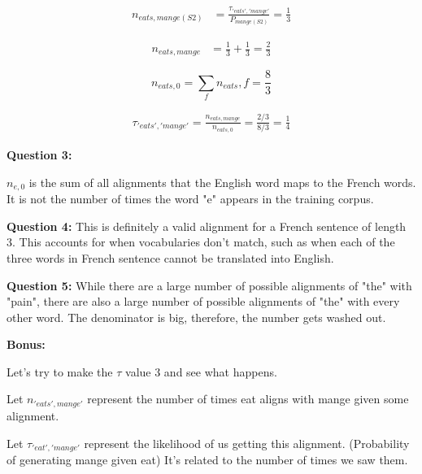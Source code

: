 \documentclass[11pt]{article}
\begin{document}
\begin{center}
\begin{flushleft}
\begin{equation}
    \begin{split}
        n_{eats, mange(S2)} & = \frac{\tau_{'eats', 'mange'}}{P_{mange(S2)}} = \frac{1}{3}
    \end{split}
\end{equation}

\begin{equation}
    \begin{split}
        n_{eats, mange} & = \frac{1}{3} + \frac{1}{3} = \frac{2}{3}
    \end{split}
\end{equation}

\begin{equation}
n_{eats, 0} = \sum_{f}{n_{eats}, f}  = \frac{8}{3}
\end{equation}

\begin{equation}
    \begin{split}
        \tau_{'eats', 'mange'} = \frac{n_{eats, mange}}{n_{eats, 0}} = \frac{2/3}{8/3} = \frac{1}{4}
    \end{split}
\end{equation}


\bigskip
\textbf{Question 3:} 

$n_{e,0}$ is the sum of all alignments that the English word maps to the French words. It is not the number of times the word "e" appears in the training corpus. 

\bigskip

\textbf{Question 4:} 
\bigskip
This is definitely a valid alignment for a French sentence of length 3. This accounts for when vocabularies don't match, such as when each of the three words in French sentence cannot be translated into English. 

\bigskip
\textbf{Question 5:} 
While there are a large number of possible alignments of "the" with "pain", there are also a large number of possible alignments of "the" with every other word. The denominator is big, therefore, the number gets washed out.

\bigskip
\textbf{Bonus: }

Let's try to make the $\tau$ value 3 and see what happens.


Let $n_{'eats', mange'}$ represent the number of times eat aligns with mange given some alignment. 

Let $\tau_{'eat', 'mange'} $ represent the likelihood of us getting this alignment. (Probability of generating mange given eat) It's related to the number of times we saw them. 


\end{flushleft}
\end{center}
\end{document}
